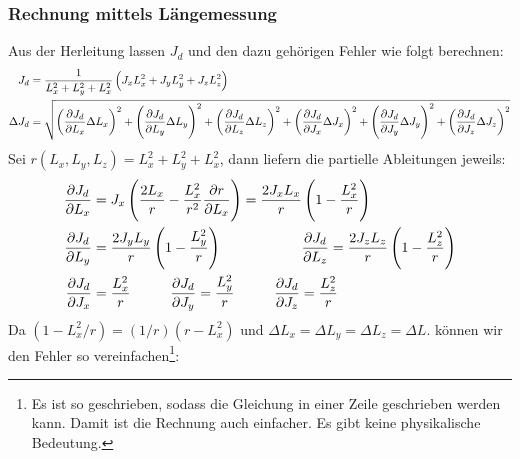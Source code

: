         \subsubsection{Rechnung mittels Längemessung}
            Aus der Herleitung lassen $J_d$ und den dazu gehörigen Fehler wie folgt berechnen:
            \begin{align}
                J_d &= \frac{1}{L_x^2+L_y^2 + L_x^2}\left(J_xL_x^2 + J_yL_y^2 + J_zL_z^2\right)\\
                \Delta J_d &= \gausserror{J_d}{L_x, L_y, L_z, J_x, J_y, J_z}
            \end{align}
            Sei $r(L_x, L_y, L_z) = L_x^2+L_y^2 + L_x^2$, dann liefern die partielle Ableitungen jeweils:
            \begin{align*}
                \pdv{J_d}{L_x} &= J_x\left(\frac{2L_x}{r}-\frac{L_x^2}{r^2}\pdv{r}{L_x}\right) = \frac{2J_xL_x}{r}\left(1 -\frac{L_x^2}{r}\right) \\
                \pdv{J_d}{L_y} &= \frac{2J_yL_y}{r}\left(1 -\frac{L_y^2}{r}\right) \hspace{2cm} \pdv{J_d}{L_z} = \frac{2J_zL_z}{r}\left(1 -\frac{L_z^2}{r}\right)\\
                \pdv{J_d}{J_x} &= \frac{L_x^2}{r} \hspace{1cm} \pdv{J_d}{J_y} = \frac{L_y^2}{r} \hspace{1cm} \pdv{J_d}{J_z} = \frac{L_z^2}{r}
            \end{align*}
            Da $(1-L_x^2/r) = (1/r)(r - L_x^2)$ und $\Delta L_x = \Delta L_y = \Delta L_z =\Delta L$. können wir den Fehler so vereinfachen\footnote{Es ist so geschrieben, sodass die Gleichung in einer Zeile geschrieben werden kann. Damit ist die Rechnung auch einfacher. Es gibt keine physikalische Bedeutung.}:
